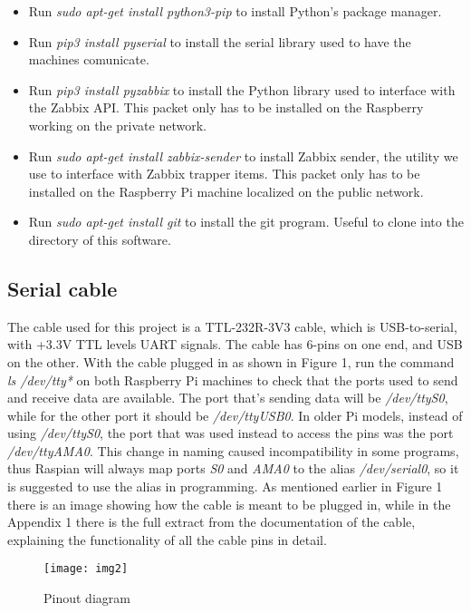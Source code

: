 \documentclass[a4paper,11pt]{scrartcl}
\begin{document}
\begin{itemize}
\begin{itemize}
        \item Run \textit{sudo apt-get install python3-pip} to install Python's package manager.
        \item Run \textit{pip3 install pyserial} to install the serial library used to have the machines comunicate.
        \item Run \textit{pip3 install pyzabbix} to install the Python library used to interface with the Zabbix API. This packet only has to be installed on the Raspberry working on the private network.
        \item Run \textit{sudo apt-get install zabbix-sender} to install Zabbix sender, the utility we use to interface with Zabbix trapper items. This packet only has to be installed on the Raspberry Pi machine localized on the public network.
        \item Run \textit{sudo apt-get install git} to install the git program. Useful to clone into the directory of this software.
    \end{itemize}
\end{itemize}

\subsection{Serial cable}
The cable used for this project is a TTL-232R-3V3 cable, which is USB-to-serial, with +3.3V TTL levels UART signals. The cable has 6-pins on one end, and USB on the other.
With the cable plugged in as shown in Figure 1, run the command \textit{ls /dev/tty*} on both Raspberry Pi machines to check that the ports used to send and receive data are available. The port that's sending data will be \textit{/dev/ttyS0}, while for the other port it should be \textit{/dev/ttyUSB0}. In older Pi models, instead of using \textit{/dev/ttyS0}, the port that was used instead to access the pins was the port \textit{/dev/ttyAMA0}. This change in naming caused incompatibility in some programs, thus Raspian will always map ports \textit{S0} and \textit{AMA0} to the alias \textit{/dev/serial0}, so it is suggested to use the alias in programming. As mentioned earlier in Figure 1 there is an image showing how the cable is meant to be plugged in, while in the Appendix 1 there is the full extract from the documentation of the cable, explaining the functionality of all the cable pins in detail.

\begin{figure}[h!]
    \centering 
    \texttt{[image: img2]}
    \caption{Pinout diagram}
    \label{fig:figure1}
\end{figure}
\end{document}
